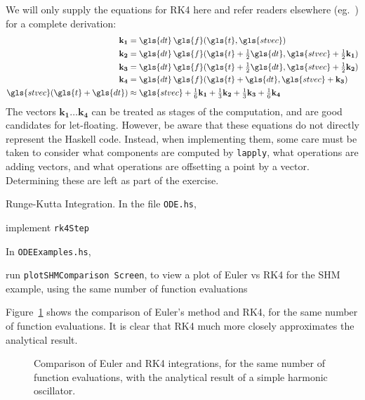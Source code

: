 \documentclass[12pt,openany]{book}
\newcommand{\filename}[1]{\texttt{#1}}  %
\newcommand{\code}[1]{\texttt{#1}}      %
\begin{document}
We will only supply the equations for RK4 here and refer readers elsewhere (eg.~\cite{press2007,battin1999}) for a complete derivation:
\begin{align}
\mathbf{k_1} &= \gls{dt}\,\gls{f}(\gls{t},\gls{stvec})\\
\mathbf{k_2} &= \gls{dt}\,\gls{f}(\gls{t} + \tfrac{1}{2}\gls{dt}, \gls{stvec} + \tfrac{1}{2}\mathbf{k_1})\\
\mathbf{k_3} &= \gls{dt}\,\gls{f}(\gls{t} + \tfrac{1}{2}\gls{dt}, \gls{stvec} + \tfrac{1}{2}\mathbf{k_2})\\
\mathbf{k_4} &= \gls{dt}\,\gls{f}(\gls{t} + \gls{dt}, \gls{stvec} + \mathbf{k_3}) \\
\gls{stvec}(\gls{t} + \gls{dt})
  &\approx
  \gls{stvec} +
  \tfrac{1}{6}\mathbf{k_1} +
  \tfrac{1}{3}\mathbf{k_2} +
  \tfrac{1}{3}\mathbf{k_3} +
  \tfrac{1}{6}\mathbf{k_4}
\end{align}
The vectors \(\mathbf{k_1}\ldots\mathbf{k_4}\) can be treated as stages of the computation, and are good candidates for let-floating. However, be aware that these equations do not directly represent the Haskell code. Instead, when implementing them, some care must be taken to consider what components are computed by \code{lapply}, what operations are adding vectors, and what operations are offsetting a point by a vector. Determining these are left as part of the exercise.

\begin{problem}[label=rk4shm]{Runge-Kutta Integration.}
  In the file \filename{ODE.hs},
  \begin{probitemize}
  \item implement \code{rk4Step}
  \end{probitemize}
  In \filename{ODEExamples.hs},
  \begin{probitemize}
  \item run \code{plotSHMComparison Screen}, to view a plot of Euler vs RK4 for the SHM example, using the same number of function evaluations
  \end{probitemize}
\end{problem}

Figure~\ref{fig:shm-comparison} shows the comparison of Euler's method and RK4, for the same number of function evaluations. It is clear that RK4 much more closely approximates the analytical result.

\begin{figure}[htbp]
  \resizebox{\textwidth}{!}{}
  \caption{Comparison of Euler and RK4 integrations, for the same number of function evaluations, with the analytical result of a simple harmonic oscillator.}
  \label{fig:shm-comparison}
\end{figure}
\end{document}
